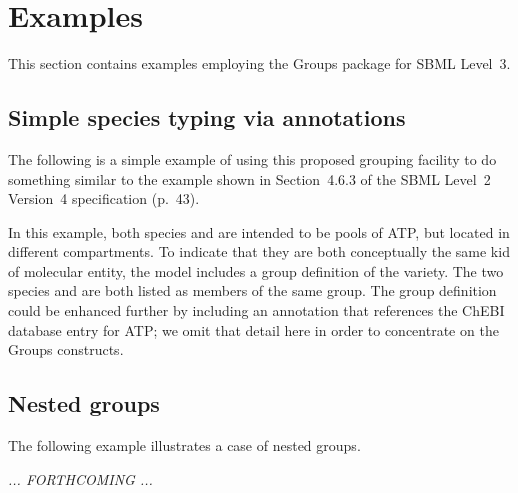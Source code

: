 
\section{Examples}
\label{examples}

This section contains examples employing the Groups package for SBML Level~3.

\subsection{Simple species typing via annotations}

The following is a simple example of using this proposed grouping facility to do something similar to the \SpeciesType example shown in Section~4.6.3 of the SBML Level~2 Version~4 specification (p.~43).


In this example, both species  and  are intended to be pools of ATP, but located in different compartments.  To indicate that they are both conceptually the same kid of molecular entity, the model includes a group definition of the  variety.  The two species  and  are both listed as members of the same group.  The group definition could be enhanced further by including an annotation that references the ChEBI database entry for ATP; we omit that detail here in order to concentrate on the Groups constructs.


\subsection{Nested groups}

The following example illustrates a case of nested groups.

\emph{... FORTHCOMING ...}

